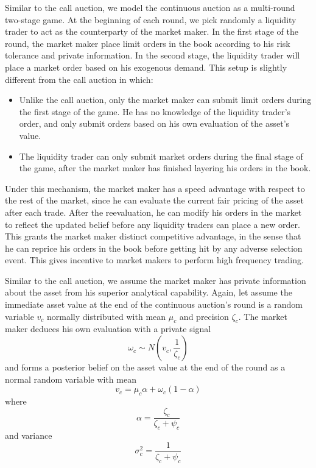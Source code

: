 Similar to the call auction, we model the continuous auction as a multi-round two-stage game. At the beginning of each round, we pick randomly a liquidity trader to act as the counterparty of the market maker. In the first stage of the round, the market maker place limit orders in the book according to his risk tolerance and private information. In the second stage, the liquidity trader will place a market order based on his exogenous demand. This setup is slightly different from the call auction in which:
\begin{itemize}
  \item Unlike the call auction, only the market maker can submit limit orders during the first stage of the game. He has no knowledge of the liquidity trader's order, and only submit orders based on his own evaluation of the asset's value.
  \item The liquidity trader can only submit market orders during the final stage of the game, after the market maker has finished layering his orders in the book.
\end{itemize}
Under this mechanism, the market maker has a speed advantage with respect to the rest of the market, since he can evaluate the current fair pricing of the asset after each trade. After the reevaluation, he can modify his orders in the market to reflect the updated belief before any liquidity traders can place a new order. This grants the market maker distinct competitive advantage, in the sense that he can reprice his orders in the book before getting hit by any adverse selection event. This gives incentive to market makers to perform high frequency trading.

Similar to the call auction, we assume the market maker has private information about the asset from his superior analytical capability. Again, let assume the immediate asset value at the end of the continuous auction's round is a random variable $v_c$ normally distributed with mean $\mu_c$ and precision $\zeta_c$. The market maker deduces his own evaluation with a private signal
\[
  \omega_c \sim N(v_c, \frac{1}{\zeta_c})
\]
and forms a posterior belief on the asset value at the end of the round as a normal random variable with mean
\[
  v_c=\mu_c \alpha + \omega_c(1 - \alpha)
\]
where
\[
  \alpha = \frac{\zeta_c}{\zeta_c+\psi_c}
\]
and variance
\[
  \sigma_c^2=\frac{1}{\zeta_c+\psi_c}
\]

